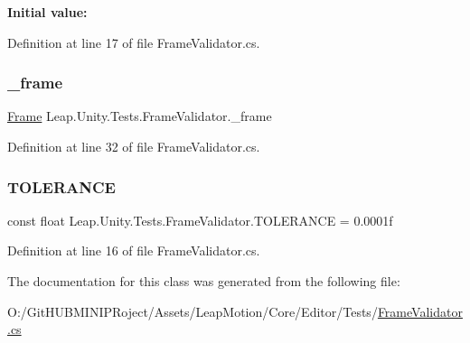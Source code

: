 {\bfseries Initial value\+:}
\begin{DoxyCode}{0}
\DoxyCodeLine{= \{}
\DoxyCodeLine{    \}}

\end{DoxyCode}


Definition at line 17 of file Frame\+Validator.\+cs.

\mbox{\label{class_leap_1_1_unity_1_1_tests_1_1_frame_validator_ab0fd118aae62aad4db938a4e919f237b}} 
\subsubsection{\texorpdfstring{\_frame}{\_frame}}
{\footnotesize\ttfamily \mbox{\hyperlink{class_leap_1_1_frame}{Frame}} Leap.\+Unity.\+Tests.\+Frame\+Validator.\+\_\+frame\hspace{0.3cm}{\ttfamily [protected]}}



Definition at line 32 of file Frame\+Validator.\+cs.

\mbox{\label{class_leap_1_1_unity_1_1_tests_1_1_frame_validator_aa8c9adab76646f9e1d8fefa1d909102d}} 
\subsubsection{\texorpdfstring{TOLERANCE}{TOLERANCE}}
{\footnotesize\ttfamily const float Leap.\+Unity.\+Tests.\+Frame\+Validator.\+T\+O\+L\+E\+R\+A\+N\+CE = 0.\+0001f\hspace{0.3cm}{\ttfamily [protected]}}



Definition at line 16 of file Frame\+Validator.\+cs.



The documentation for this class was generated from the following file\+:\begin{DoxyCompactItemize}
\item 
O\+:/\+Git\+H\+U\+B\+M\+I\+N\+I\+P\+Roject/\+Assets/\+Leap\+Motion/\+Core/\+Editor/\+Tests/\mbox{\hyperlink{_frame_validator_8cs}{Frame\+Validator.\+cs}}\end{DoxyCompactItemize}
